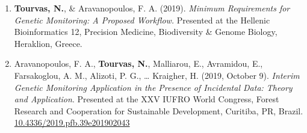 \documentclass[12pt,]{scrartcl}
\begin{document}
\vspace{-3mm}
\begin{enumerate}
\leftskip-0.13in
	\setcounter{enumi}{1}
	
\leftskip-0.07in  

\leftskip-0.07in  


\item \textbf{Tourvas, N.}, \& Aravanopoulos, F. A. (2019). \textit{Minimum Requirements for Genetic Monitoring: A Proposed Workflow.} Presented at the Hellenic Bioinformatics 12, Precision Medicine, Biodiversity \& Genome Biology, Heraklion, Greece.

\item Aravanopoulos, F. A., \textbf{Tourvas, N.}, Malliarou, E., Avramidou, E., Farsakoglou, A. M., Alizoti, P. G., … Kraigher, H. (2019, October 9). \textit{Interim Genetic Monitoring Application in the Presence of Incidental Data: Theory and Application}. Presented at the XXV IUFRO World Congress, Forest Research and Cooperation for Sustainable Development, Curitiba, PR, Brazil. \href{https://doi.org/10.4336/2019.pfb.39e201902043}{10.4336/2019.pfb.39e201902043}




\end{enumerate}
\end{document}
